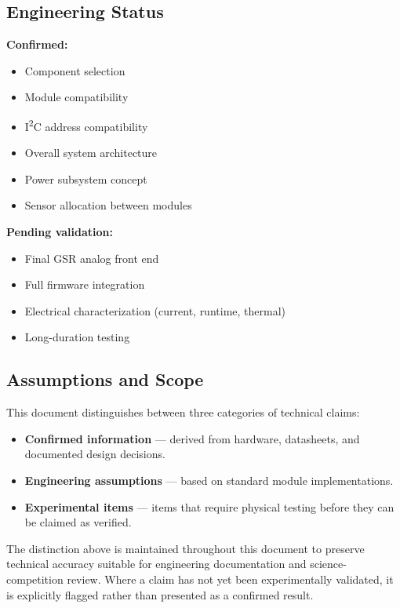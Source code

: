 \subsection{Engineering Status}
\label{sec:engineering-status}

\begin{validationbox}
\textbf{Confirmed:}
\begin{itemize}
    \item Component selection
    \item Module compatibility
    \item I\textsuperscript{2}C address compatibility
    \item Overall system architecture
    \item Power subsystem concept
    \item Sensor allocation between modules
\end{itemize}
\end{validationbox}

\begin{requirementbox}
\textbf{Pending validation:}
\begin{itemize}
    \item Final GSR analog front end
    \item Full firmware integration
    \item Electrical characterization (current, runtime, thermal)
    \item Long-duration testing
\end{itemize}
\end{requirementbox}

\subsection{Assumptions and Scope}
\label{sec:assumptions-scope}

This document distinguishes between three categories of technical claims:

\begin{itemize}
    \item \textbf{Confirmed information} --- derived from hardware, datasheets, and documented design decisions.
    \item \textbf{Engineering assumptions} --- based on standard module implementations.
    \item \textbf{Experimental items} --- items that require physical testing before they can be claimed as verified.
\end{itemize}

\begin{assumptionbox}
The distinction above is maintained throughout this document to preserve technical accuracy suitable for engineering documentation and science-competition review. Where a claim has not yet been experimentally validated, it is explicitly flagged rather than presented as a confirmed result.
\end{assumptionbox}
